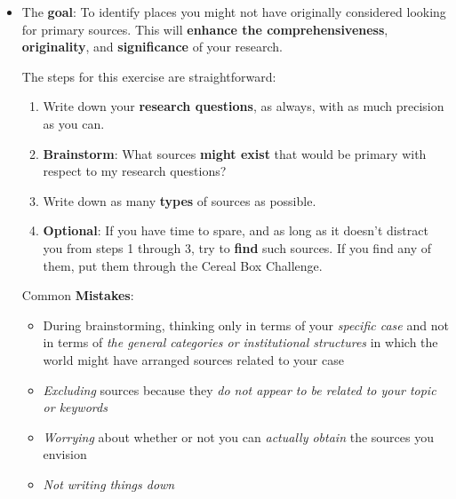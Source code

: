 \documentclass[11pt]{article}
\begin{document}
\begin{itemize}
\vspace{20pt}
\item \begin{exercise}

The \textbf{goal}: To identify places you might not have originally considered looking for primary sources. This will \textbf{enhance the comprehensiveness}, \textbf{originality}, and \textbf{significance} of your research.

The steps for this exercise are straightforward:
\begin{enumerate}
\item Write down your \textbf{research questions}, as always, with as much precision as you can.
\item \textbf{Brainstorm}: What sources \textbf{might exist} that would be primary with respect to my research questions?
\item Write down as many \textbf{types} of sources as possible.
\item \textbf{Optional}: If you have time to spare, and as long as it doesn’t distract you from steps 1 through 3, try to \textbf{find} such sources. If you find any of them, put them through the Cereal Box Challenge.
\end{enumerate}
\end{exercise} 
Common \textbf{Mistakes}:
\begin{itemize}
\item During brainstorming, thinking only in terms of your \emph{specific case} and not in terms of \emph{the general categories or institutional structures} in which the world might have arranged sources related to your case

\item \emph{Excluding} sources because they \emph{do not appear to be related to your topic or keywords}

\item \emph{Worrying} about whether or not you can \emph{actually obtain} the sources you envision

\item \emph{Not writing things down}
\end{itemize}

\end{itemize}
\end{document}
